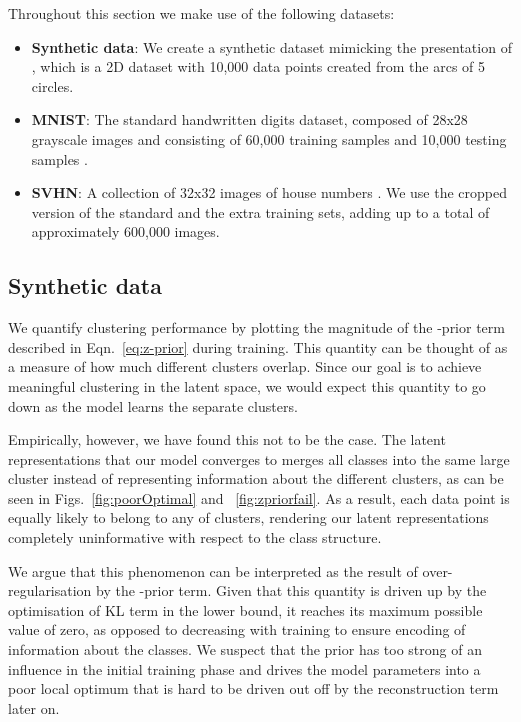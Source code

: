 \documentclass{article} \usepackage{iclr2017_conference,times}
\begin{document}
Throughout this section we make use of the following datasets:

\begin{itemize}
\item \textbf{Synthetic data}: We create a synthetic dataset mimicking the presentation of \cite{johnson2016composing}, which is a 2D dataset with 10,000 data points created from the arcs of 5 circles.

\item \textbf{MNIST}: The standard handwritten digits dataset, composed of 28x28 grayscale images and consisting of 60,000 training samples and 10,000 testing samples \citep{lecun1998gradient}.

\item \textbf{SVHN}: A collection of 32x32 images of house numbers \citep{netzer2011reading}. We use the cropped version of the standard and the extra training sets, adding up to a total of approximately 600,000 images.
\end{itemize}

\subsection{Synthetic data}

We quantify clustering performance by plotting the magnitude of the -prior term described in Eqn.~\ref{eq:z-prior} during training. This quantity can be thought of as a measure of how much different clusters overlap. Since our goal is to achieve meaningful clustering in the latent space, we would expect this quantity to go down as the model learns the separate clusters.



Empirically, however, we have found this not to be the case. The latent representations that our model converges to merges all classes into the same large cluster instead of representing information about the different clusters, as can be seen in Figs.~\ref{fig:poorOptimal} and ~\ref{fig:zpriorfail}. As a result, each data point is equally likely to belong to any of clusters, rendering our latent representations completely uninformative with respect to the class structure.

We argue that this phenomenon can be interpreted as the result of over-regularisation by the -prior term. Given that this quantity is driven up by the optimisation of KL term in the lower bound, it reaches its maximum possible value of zero, as opposed to decreasing with training to ensure encoding of information about the classes. We suspect that the prior has too strong of an influence in the initial training phase and drives the model parameters into a poor local optimum that is hard to be driven out off by the reconstruction term later on.
\end{document}
